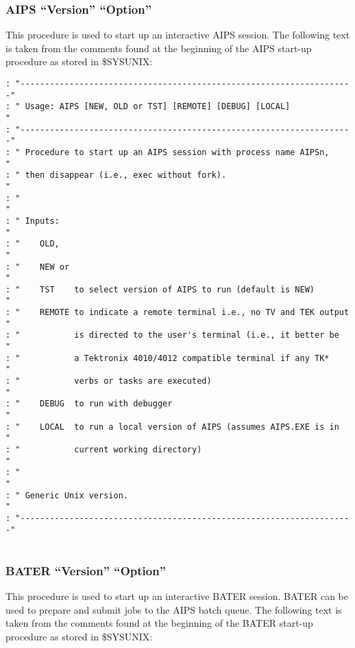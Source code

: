 \subsubsection{AIPS ``Version'' ``Option''}
This procedure is used to start up an interactive AIPS session.  The
following text is taken from the comments found at the beginning of
the AIPS start-up procedure as stored in \$SYSUNIX:

\begin{verbatim}
: "--------------------------------------------------------------------"
: " Usage: AIPS [NEW, OLD or TST] [REMOTE] [DEBUG] [LOCAL]             "
: "--------------------------------------------------------------------"
: " Procedure to start up an AIPS session with process name AIPSn,     "
: " then disappear (i.e., exec without fork).                          "
: "                                                                    "
: " Inputs:                                                            "
: "    OLD,                                                            "
: "    NEW or                                                          "
: "    TST    to select version of AIPS to run (default is NEW)        "
: "    REMOTE to indicate a remote terminal i.e., no TV and TEK output "
: "           is directed to the user's terminal (i.e., it better be   "
: "           a Tektronix 4010/4012 compatible terminal if any TK*     "
: "           verbs or tasks are executed)                             "
: "    DEBUG  to run with debugger                                     "
: "    LOCAL  to run a local version of AIPS (assumes AIPS.EXE is in   "
: "           current working directory)                               "
: "                                                                    "
: " Generic Unix version.                                              "
: "--------------------------------------------------------------------"


\end{verbatim}

\subsubsection{BATER ``Version'' ``Option''}
This procedure is used to start up an interactive BATER session.
BATER can be used to prepare and submit jobs to the AIPS batch queue.
The following text is taken from the comments found at the beginning
of the BATER start-up procedure as stored in \$SYSUNIX:

